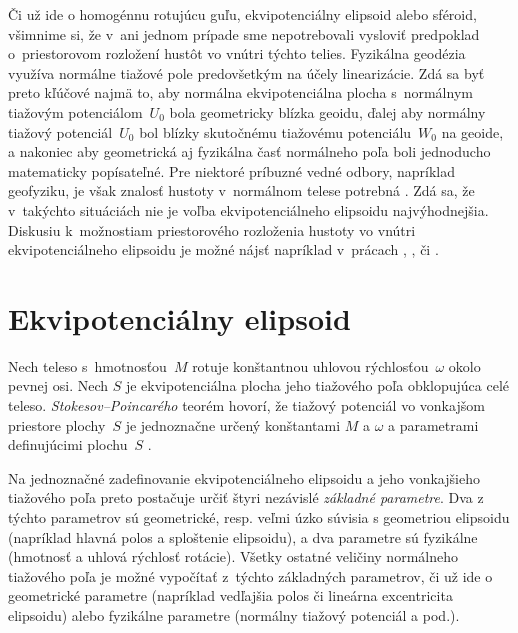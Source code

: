 \documentclass[a4paper,12pt]{book}
\begin{document}
Či už ide o homogénnu rotujúcu guľu, ekvipotenciálny elipsoid alebo sféroid, 
všimnime si, že v~ani jednom prípade sme nepotrebovali vysloviť predpoklad 
o~priestorovom rozložení hustôt vo vnútri týchto telies.  Fyzikálna geodézia 
využíva normálne tiažové pole predovšetkým na účely linearizácie.  Zdá sa byť 
preto kľúčové najmä to, aby normálna ekvipotenciálna plocha s~normálnym 
tiažovým potenciálom~$U_0$ bola geometricky blízka geoidu, ďalej aby normálny 
tiažový potenciál~$U_0$ bol blízky skutočnému tiažovému potenciálu~$W_0$ na 
geoide, a nakoniec aby geometrická aj fyzikálna časť normálneho poľa boli 
jednoducho matematicky popísateľné.  Pre niektoré príbuzné vedné odbory, 
napríklad geofyziku, je však znalosť hustoty v~normálnom telese potrebná 
\parencite{Karcol2017}.  Zdá sa, že v~takýchto situáciách nie je voľba 
ekvipotenciálneho elipsoidu najvýhodnejšia.  Diskusiu k~možnostiam 
priestorového rozloženia hustoty vo vnútri ekvipotenciálneho elipsoidu je možné 
nájsť napríklad v~prácach \textcite{MoritzTheFigureOfTheEarth}, 
\textcite{TorgeGeodesy}, \textcite{Conway2000} či \textcite{Karcol2017}.



\section{Ekvipotenciálny elipsoid}

Nech teleso s~hmotnosťou~$M$ rotuje konštantnou uhlovou rýchlosťou~$\omega$ 
okolo pevnej osi.  Nech $S$ je ekvipotenciálna plocha jeho tiažového poľa 
obklopujúca celé teleso.  \emph{Stokesov--Poincarého} teorém hovorí, že tiažový 
potenciál vo vonkajšom priestore plochy~$S$ je jednoznačne určený konštantami 
$M$ a $\omega$ a parametrami definujúcimi plochu~$S$ \parencite{TorgeGeodesy}.

Na jednoznačné zadefinovanie ekvipotenciálneho elipsoidu a jeho vonkajšieho 
tiažového poľa preto postačuje určiť štyri nezávislé \emph{základné parametre}.  
Dva z týchto parametrov sú geometrické, resp. veľmi úzko súvisia s geometriou 
elipsoidu (napríklad hlavná polos a sploštenie elipsoidu), a dva parametre sú 
fyzikálne (hmotnosť a uhlová rýchlosť rotácie).  Všetky ostatné veličiny 
normálneho tiažového poľa je možné vypočítať z~týchto základných parametrov, či 
už ide o geometrické parametre (napríklad vedľajšia polos či lineárna 
excentricita elipsoidu) alebo fyzikálne parametre (normálny tiažový potenciál 
a pod.).
\end{document}

